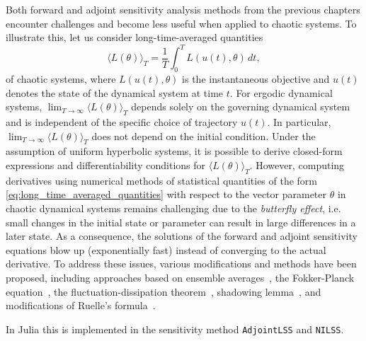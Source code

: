 Both forward and adjoint sensitivity analysis methods from the previous chapters encounter challenges and become less useful when applied to chaotic systems.
To illustrate this, let us consider long-time-averaged quantities 
\begin{equation}\label{eq:long_time_averaged_quantities}
    \langle L(\theta) \rangle_T = \frac{1}{T} \int_0^T L(u(t), \theta) \, dt, 
\end{equation}
of chaotic systems, where $L(u(t), \theta)$ is the instantaneous objective and $u(t)$ denotes the state of the dynamical system at time $t$.
For ergodic dynamical systems, $\lim_{T\to\infty} \langle L(\theta) \rangle_T$ depends solely on the governing dynamical system and is independent of the specific choice of trajectory $u(t)$. 
In particular, $\lim_{T\to\infty} \langle L(\theta) \rangle_T$ does not depend on the initial condition. 
Under the assumption of uniform hyperbolic systems, it is possible to derive closed-form expressions and differentiability conditions for $ \langle L(\theta) \rangle_T$\cite{ruelle1997differentiation,ruelle2009review}. 
However, computing derivatives using numerical methods of statistical quantities of the form \eqref{eq:long_time_averaged_quantities} with respect to the vector parameter $\theta$ in chaotic dynamical systems remains challenging due to the \textit{butterfly effect}, i.e. small changes in the initial state or parameter can result in large differences in a later state. 
As a consequence, the solutions of the forward and adjoint sensitivity equations blow up (exponentially fast) instead of converging to the actual derivative.
To address these issues, various modifications and methods have been proposed, including approaches based on ensemble averages~\cite{lea2000sensitivity, eyink2004ruelle}, the Fokker-Planck equation~\cite{thuburn2005climate, blonigan2014probability}, the fluctuation-dissipation theorem~\cite{leith1975climate, abramov2007blended, abramov2008new}, shadowing lemma~\cite{wang2013forward, wang2014least, wang2014convergence, ni2017sensitivity, blonigan2017adjoint, blonigan2018multiple, ni2019adjoint, ni2019sensitivity}, and modifications of Ruelle's formula~\cite{chandramoorthy2022efficient, ni2020fast}.

In Julia this is implemented in the sensitivity method \texttt{AdjointLSS} and \texttt{NILSS}.